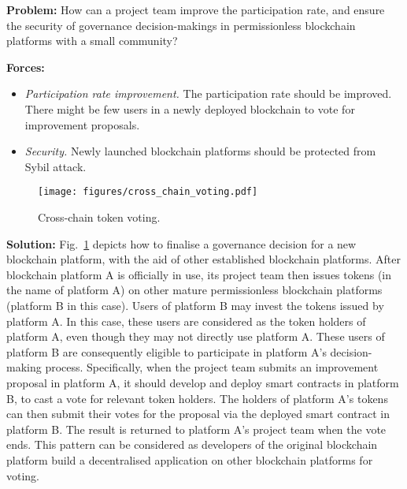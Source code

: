 \documentclass{article}
\begin{document}
\vspace{0.5em}\noindent \textbf{Problem:} How can a project team improve the participation rate, and ensure the security of governance decision-makings in permissionless blockchain platforms with a small community?

\vspace{0.5em}\noindent \textbf{Forces:} 

\begin{itemize}
  \item \textit{Participation rate improvement.} The participation rate should be improved. There might be few users in a newly deployed blockchain to vote for improvement proposals.
  
  
  \item \textit{Security.} Newly launched blockchain platforms should be protected from Sybil attack.
  
\end{itemize}

\begin{figure}[!ht]
	\centering
	\texttt{[image: figures/cross\_chain\_voting.pdf]}
	\caption{Cross-chain token voting.}
	\label{pic:cross_chain_voting}
\end{figure}

\vspace{0.5em}\noindent \textbf{Solution:} Fig.~\ref{pic:cross_chain_voting} depicts how to finalise a governance decision for a new blockchain platform, with the aid of other established blockchain platforms. After blockchain platform A is officially in use, its project team then issues tokens (in the name of platform A) on other mature permissionless blockchain platforms (platform B in this case). Users of platform B may invest the tokens issued by platform A. In this case, these users are considered as the token holders of platform A, even though they may not directly use platform A. These users of platform B are consequently eligible to participate in platform A's decision-making process. Specifically, when the project team submits an improvement proposal in platform A, it should develop and deploy smart contracts in platform B, to cast a vote for relevant token holders. The holders of platform A's tokens can then submit their votes for the proposal via the deployed smart contract in platform B. The result is returned to platform A's project team when the vote ends. This pattern can be considered as developers of the original blockchain platform build a decentralised application on other blockchain platforms for voting. 
\end{document}
